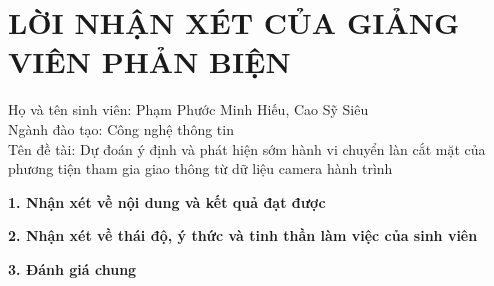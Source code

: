 \newpage
\thispagestyle{empty}

\section*{LỜI NHẬN XÉT CỦA GIẢNG VIÊN PHẢN BIỆN}

\vspace{0.3cm}

\noindent
Họ và tên sinh viên: Phạm Phước Minh Hiếu, Cao Sỹ Siêu\\
Ngành đào tạo: Công nghệ thông tin\\
Tên đề tài: Dự đoán ý định và phát hiện sớm hành vi chuyển làn cắt mặt của phương tiện tham gia giao thông từ dữ liệu camera hành trình

\vspace{0.5cm}

\noindent
\textbf{1. Nhận xét về nội dung và kết quả đạt được}

\vspace{0.15cm}
\noindent\dotfill\par
\noindent\dotfill\par
\noindent\dotfill\par
\noindent\dotfill\par
\noindent\dotfill\par
\noindent\dotfill

\vspace{0.45cm}

\noindent
\textbf{2. Nhận xét về thái độ, ý thức và tinh thần làm việc của sinh viên}

\vspace{0.15cm}
\noindent\dotfill\par
\noindent\dotfill\par
\noindent\dotfill\par
\noindent\dotfill\par
\noindent\dotfill\par
\noindent\dotfill

\vspace{0.45cm}

\noindent
\textbf{3. Đánh giá chung}

\vspace{0.15cm}
\noindent\dotfill\par
\noindent\dotfill\par
\noindent\dotfill\par
\noindent\dotfill\par
\noindent\dotfill\par
\noindent\dotfill

